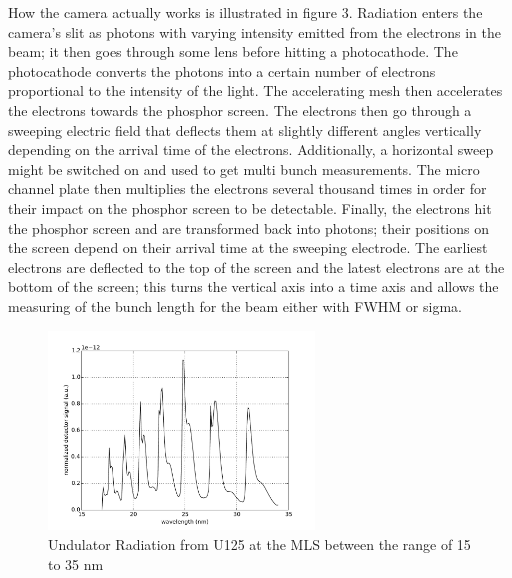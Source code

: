 \documentclass[%
 reprint,%
 amssymb, amsmath,%
 aip,cha,%
]{revtex4-1}
\begin{document}
How the camera actually works is illustrated in figure 3. Radiation enters the camera's slit as photons with varying intensity emitted from the electrons in the beam; it then goes through some lens before hitting a photocathode. The photocathode converts the photons into a certain number of electrons proportional to the intensity of the light. The accelerating mesh then accelerates the electrons towards the phosphor screen. The electrons then go through a sweeping electric field that deflects them at slightly different angles vertically depending on the arrival time of the electrons. Additionally, a horizontal sweep might be switched on and used to get multi bunch measurements. The micro channel plate then multiplies the electrons several thousand times in order for their impact on the phosphor screen to be detectable. Finally, the electrons hit the phosphor screen and are transformed back into photons; their positions on the screen depend on their arrival time at the sweeping electrode. The earliest electrons are deflected to the top of the screen and the latest electrons are at the bottom of the screen; this turns the vertical axis into a time axis and allows the measuring of the bunch length for the beam either with FWHM or sigma.
\begin{figure}
\begin{center}
\includegraphics[width=200pt]{uplot.pdf}
\caption{Undulator Radiation from U125 at the MLS between the range of 15 to 35 nm}
\label{Uradiation}
\end{center}
\end{figure}
\end{document}
